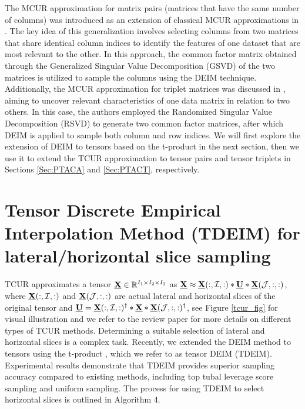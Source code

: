 \documentclass[preprint,12pt]{elsarticle}
\theoremstyle{definition}
\newcommand{\cX}{\underline{\bf X}}
\newcommand{\cU}{\underline{\bf U}}
\begin{document}
The MCUR approximation for matrix pairs (matrices that have the same number of columns) was introduced as an extension of classical MCUR approximations in \cite{gidisu2022generalized}. The key idea of this generalization involves selecting columns from two matrices that share identical column indices to identify the features of one dataset that are most relevant to the other. In this approach, the common factor matrix obtained through the Generalized Singular Value Decomposition (GSVD) of the two matrices is utilized to sample the columns using the DEIM technique. Additionally, the MCUR approximation for triplet matrices was discussed in \cite{gidisu2022restricted}, aiming to uncover relevant characteristics of one data matrix in relation to two others. In this case, the authors employed the Randomized Singular Value Decomposition (RSVD) to generate two common factor matrices, after which DEIM is applied to sample both column and row indices. We will first explore the extension of DEIM to tensors based on the t-product in the next section, then we use it to extend the TCUR approximation to tensor pairs and tensor triplets in Sections \ref{Sec:PTACA} and \ref{Sec:PTACT}, respectively.  


\section{Tensor Discrete Empirical Interpolation Method (TDEIM) for lateral/horizontal slice sampling}\label{deimt}
TCUR approximates a tensor $\cX\in\mathbb{R}^{I_1\times I_2\times I_3}$ as $\cX\approx\cX(:,\mathcal{I},:)*\cU*\cX(\mathcal{J},:,:)$, where $\cX(:,\mathcal{I},:)$ and $\cX(\mathcal{J},:,:)$ are actual lateral and horizontal slices of the original tensor and $\cU=\cX(:,\mathcal{I},:)^{\dagger}*\cX*\cX(\mathcal{J},:,:)^{\dagger}$, see Figure \ref{tcur_fig} for visual illustration and we refer to the review paper \cite{ahmadi2021cross} for more details on different types of TCUR methods. Determining a suitable selection of lateral and horizontal slices is a complex task. Recently, we extended the DEIM method to tensors using the t-product \cite{ahmadi2024robust}, which we refer to as tensor DEIM (TDEIM). Experimental results demonstrate that TDEIM provides superior sampling accuracy compared to existing methods, including top tubal leverage score sampling and uniform sampling. The process for using TDEIM to select horizontal slices is outlined in Algorithm 4.
\end{document}

